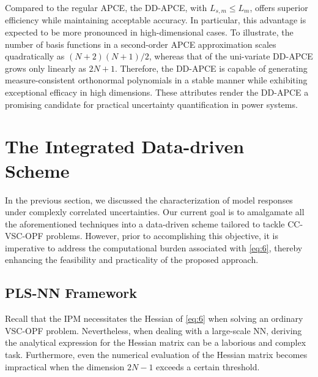 \documentclass[journal]{IEEEtran}
\theoremstyle{definition}
\theoremstyle{remark}
\begin{document}
Compared to the regular APCE, the DD-APCE, with $L_{s,m}\leq L_{m}$, offers superior efficiency while maintaining acceptable accuracy. In particular, this advantage is expected to be more pronounced in high-dimensional cases. To illustrate, the number of basis functions in a second-order APCE approximation scales quadratically as $(N+2)(N+1)/2$, whereas that of the uni-variate DD-APCE grows only linearly as $2N+1$. 
Therefore, the DD-APCE is capable of generating measure-consistent orthonormal polynomials in a stable manner while exhibiting exceptional efficacy in high dimensions. These attributes render the DD-APCE a promising candidate for practical uncertainty quantification in power systems.
\section{The Integrated Data-driven Scheme}\label{scheme}
In the previous section, we discussed the characterization of model responses under complexly correlated uncertainties. Our current goal is to amalgamate all the aforementioned techniques into a data-driven scheme tailored to tackle CC-VSC-OPF problems. However, prior to accomplishing this objective, it is imperative to address the computational burden associated with \eqref{eq:6}, thereby enhancing the feasibility and practicality of the proposed approach.
\subsection{PLS-NN Framework}
Recall that the IPM necessitates the Hessian of \eqref{eq:6} when solving an ordinary VSC-OPF problem. Nevertheless, when dealing with a large-scale NN, deriving the analytical expression for the Hessian matrix can be a laborious and complex task. Furthermore, even the numerical evaluation of the Hessian matrix becomes impractical when the dimension $2N-1$ exceeds a certain threshold.
\end{document}
